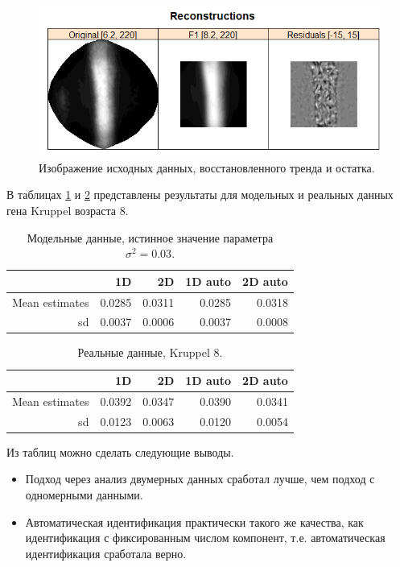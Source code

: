\documentclass[specialist,
               substylefile = spbu.rtx,
               subf,href,colorlinks=true, 12pt]{disser}
\begin{document}
\begin{figure}[!hhh]
	\begin{center}
	\includegraphics[scale=0.6]{bk1_2d_rec}
	\end{center}
	\caption{Изображение исходных данных, восстановленного тренда и остатка.}
	\label{fig:real_data_2d}
\end{figure}

В таблицах \ref{tab:model_est_compare} и \ref{tab:real_est_compare} представлены результаты для модельных и реальных данных гена Kruppel возраста 8.

 \begin{table}[hhh!]
\caption{Модельные данные, истинное значение параметра $\sigma^2=0.03$.}
 \centering
 \begin{tabular}{rrrrr}
  \hline
  & 1D  & 2D  & 1D auto  & 2D auto \\
  \hline
  Mean estimates & 0.0285 & 0.0311 & 0.0285 & 0.0318 \\
  sd & 0.0037 & 0.0006 & 0.0037 & 0.0008 \\
 \end{tabular}
  \label{tab:model_est_compare}
 \end{table}
  \begin{table}[hhh!]
\caption{Реальные данные, Kruppel 8.}
 \centering
 \begin{tabular}{rrrrr}
  \hline
  & 1D  & 2D   & 1D auto & 2D auto \\
  \hline
  Mean estimates & 0.0392 & 0.0347 & 0.0390 & 0.0341 \\
  sd & 0.0123 & 0.0063 & 0.0120 & 0.0054 \\
 \end{tabular}
 \label{tab:real_est_compare}
 \end{table}

Из таблиц можно сделать следующие выводы.
\begin{itemize}
\item Подход через анализ двумерных данных сработал лучше, чем подход с одномерными данными.
\item Автоматическая идентификация практически такого же качества, как идентификация с фиксированным числом компонент, т.е. автоматическая идентификация сработала верно.
\end{itemize}
\end{document}
